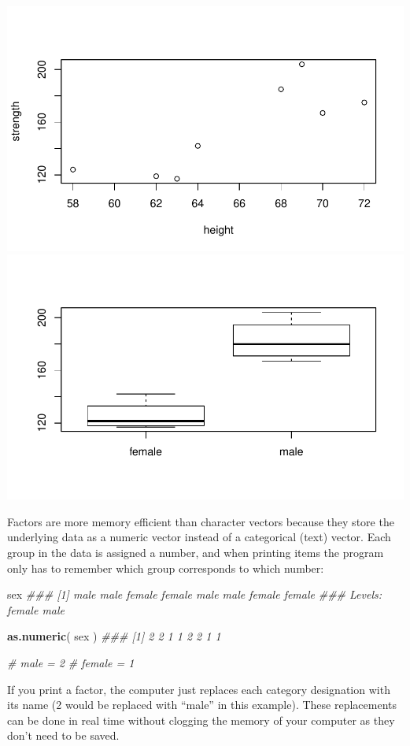 \documentclass[]{book}
\newenvironment{Shaded}{\begin{snugshade}}{\end{snugshade}}
\newcommand{\CommentTok}[1]{\textcolor[rgb]{0.56,0.35,0.01}{\textit{#1}}}
\newcommand{\KeywordTok}[1]{\textcolor[rgb]{0.13,0.29,0.53}{\textbf{#1}}}
\newcommand{\NormalTok}[1]{#1}
\theoremstyle{definition}
\theoremstyle{definition}
\theoremstyle{definition}
\theoremstyle{remark}
\begin{document}
\begin{center}\includegraphics[width=0.7\linewidth]{DS4PS-I_files/figure-latex/unnamed-chunk-64-1} \includegraphics[width=0.7\linewidth]{DS4PS-I_files/figure-latex/unnamed-chunk-64-2} \end{center}

Factors are more memory efficient than character vectors because they
store the underlying data as a numeric vector instead of a categorical
(text) vector. Each group in the data is assigned a number, and when
printing items the program only has to remember which group corresponds
to which number:

\begin{Shaded}
\begin{Highlighting}[]
\NormalTok{sex}
\CommentTok{### [1] male   male   female female male   male   female female}
\CommentTok{### Levels: female male}

\KeywordTok{as.numeric}\NormalTok{( sex )}
\CommentTok{### [1] 2 2 1 1 2 2 1 1}

\CommentTok{#  male = 2}
\CommentTok{#  female = 1}
\end{Highlighting}
\end{Shaded}

If you print a factor, the computer just replaces each category
designation with its name (2 would be replaced with ``male'' in this
example). These replacements can be done in real time without clogging
the memory of your computer as they don't need to be saved.
\end{document}
